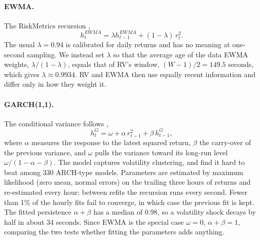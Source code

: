 \documentclass[11pt]{article}
\begin{document}
\paragraph{EWMA.}
The RiskMetrics recursion \citep{riskmetrics1996},
\begin{equation}
  h_t^{EWMA} = \lambda h_{t-1}^{EWMA} + (1-\lambda)\, r_t^2 .
  \label{eq:ewma}
\end{equation}
The usual $\lambda = 0.94$ is calibrated for daily returns and has no meaning at one-second sampling.
We instead set $\lambda$ so that the average age of the data EWMA weights, $\lambda/(1-\lambda)$, equals
that of RV's window, $(W-1)/2 = 149.5$ seconds, which gives $\lambda \approx 0.9934$. RV and EWMA then
use equally recent information and differ only in how they weight it.

\paragraph{GARCH(1,1).}
The conditional variance follows \citet{bollerslev1986},
\begin{equation}
  h_t^{G} = \omega + \alpha\, r_{t-1}^2 + \beta\, h_{t-1}^{G} ,
  \label{eq:garch}
\end{equation}
where $\alpha$ measures the response to the latest squared return, $\beta$ the carry-over of the previous
variance, and $\omega$ pulls the variance toward its long-run level $\omega/(1-\alpha-\beta)$. The model
captures volatility clustering, and \citet{hansenlunde2005} find it hard to beat among 330 ARCH-type
models. Parameters are estimated by
maximum likelihood (zero mean, normal errors) on the trailing three hours of returns and re-estimated
every hour; between refits the recursion runs every second. Fewer than 1\% of the hourly fits fail to
converge, in which case the previous fit is kept. The fitted persistence $\alpha + \beta$ has a median
of 0.98, so a volatility shock decays by half in about 34 seconds. Since EWMA is the special case $\omega = 0$, $\alpha + \beta = 1$, comparing the two tests
whether fitting the parameters adds anything.
\end{document}
